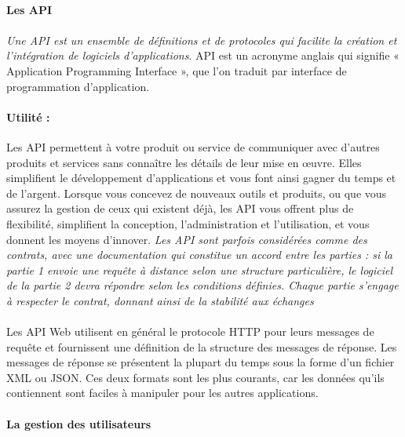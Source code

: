                 \paragraph{Les API}
                \paragraph{}
                \textit{Une API est un ensemble de définitions et de protocoles qui facilite la création et 
                l'intégration de logiciels d'applications}\cite{RedHat}. API est un acronyme anglais qui signifie 
                « Application Programming Interface », que l'on traduit par interface de programmation d'application.
                \paragraph{Utilité :}
                Les API permettent à votre produit ou service de communiquer avec d'autres produits et services 
                sans connaître les détails de leur mise en œuvre. Elles simplifient le développement d'applications 
                et vous font ainsi gagner du temps et de l'argent. Lorsque vous concevez de nouveaux outils et produits, 
                ou que vous assurez la gestion de ceux qui existent déjà, les API vous offrent plus de flexibilité, 
                simplifient la conception, l'administration et l'utilisation, et vous donnent les moyens d'innover.
                \textit{Les API sont parfois considérées comme des contrats, avec une documentation qui constitue 
                un accord entre les parties : si la partie 1 envoie une requête à distance selon une structure 
                particulière, le logiciel de la partie 2 devra répondre selon les conditions définies. 
                Chaque partie s’engage à respecter le contrat, donnant ainsi de la stabilité aux échanges}\cite{Alteva}
                \paragraph{}
                Les API Web utilisent en général le protocole HTTP pour leurs messages de requête et fournissent une 
                définition de la structure des messages de réponse. Les messages de réponse se présentent 
                la plupart du temps sous la forme d'un fichier XML ou JSON. Ces deux formats sont les plus courants, 
                car les données qu'ils contiennent sont faciles à manipuler pour les autres applications.
                \paragraph{La gestion des utilisateurs}
